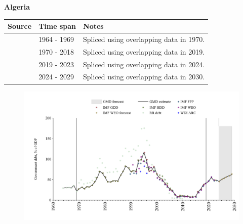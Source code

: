 \documentclass[12pt,a4paper,landscape]{article}
\begin{document}
\begin{adjustbox}{max totalsize={\paperwidth}{\paperheight},center}
\begin{minipage}[t][\textheight][t]{\textwidth}
\vspace*{0.5cm}
{}
\begin{center}
{\Large\bfseries Algeria}
\end{center}
\vspace{0.5cm}
\begin{table}[H]
\centering
\small
\begin{tabular}{|l|l|l|}
\hline
\textbf{Source} & \textbf{Time span} & \textbf{Notes} \\
\hline
\rowcolor{white}\cite{RR_debt}& 1964 - 1969 &Spliced using overlapping data in 1970.\\
\rowcolor{lightgray}\cite{IMF_GDD}& 1970 - 2018 &Spliced using overlapping data in 2019.\\
\rowcolor{white}\cite{IMF_FPP}& 2019 - 2023 &Spliced using overlapping data in 2024.\\
\rowcolor{lightgray}\cite{IMF_WEO_forecast}& 2024 - 2029 &Spliced using overlapping data in 2030.\\
\hline
\end{tabular}
\end{table}
\begin{figure}[H]
\centering
\includegraphics[width=\textwidth,height=0.6\textheight,keepaspectratio]{graphs/DZA_govdebt_GDP.pdf}
\end{figure}
\end{minipage}
\end{adjustbox}
\end{document}
